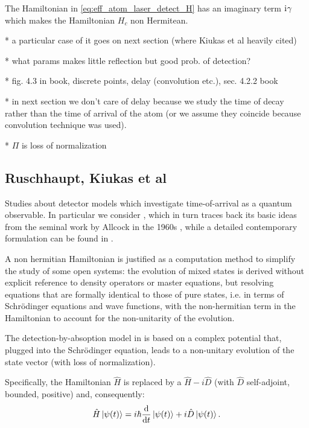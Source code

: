 The Hamiltonian in \eqref{eq:eff_atom_laser_detect_H} has an imaginary term $\mathrm{i}\mkern1mu\gamma$
which makes the Hamiltonian $H_c$ non Hermitean.

* a particular case of it goes on next section (where Kiukas et al heavily cited)

* what params makes little reflection but good prob. of detection?

* fig. 4.3 in book, discrete points, delay (convolution etc.), sec. 4.2.2 book

* in next section we don't care of delay because we study the time of decay rather than the time of arrival of the atom (or we assume they coincide because convolution technique was used).

* $\Pi$ is loss of normalization

\subsection{Ruschhaupt, Kiukas et al}\label{sec:hist:detect:kiukas}

Studies
about detector models which investigate
time-of-arrival as a quantum observable.
In particular we consider \cite{RuschhauptAbsorption},
which in turn traces back its basic ideas from the seminal work by Allcock
in the 1960s \parencite{Allcock-1, Allcock-2, Allcock-3},
while a detailed contemporary formulation can be found in
\cite[Ch. 4]{TQM2}.

A non hermitian Hamiltonian is justified as a computation method
to simplify the study of some open systems: the evolution of mixed
states is derived without explicit reference to density operators
or master equations, but resolving equations that are formally
identical to those of pure states,
i.e. in terms of
Schr{\"o}dinger equations and wave functions,
with the non-hermitian term in the Hamiltonian
to account for the non-unitarity of the evolution.

The detection-by-absoption model in \cite{RuschhauptAbsorption}
is based on a complex potential that, plugged into the Schr\"odinger equation,
leads to a non-unitary evolution of the state vector
(with loss of normalization).

Specifically, the Hamiltonian $\hat{H}$ is replaced by a $\hat{H} - i\hat{D}$
(with $\hat{D}$ self-adjoint, bounded, positive)
and, consequently:
\begin{equation}\label{eq:schrod_complex_pot}
  \hat{H} \ket{\psi(t)} = i\hbar\dv{t}\ket{\psi(t)} +i\hat{D}\ket{\psi(t)} \text{.}
\end{equation}

